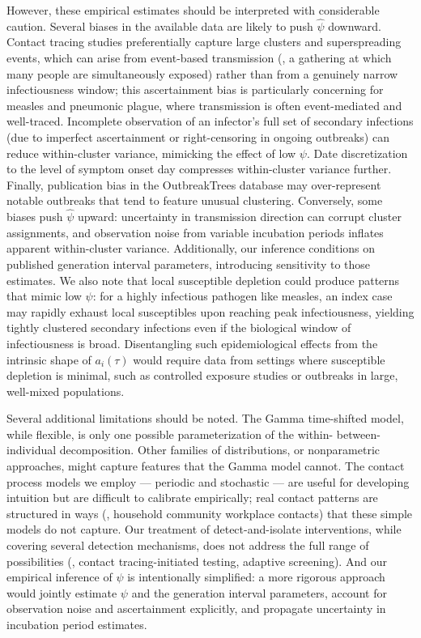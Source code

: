 However, these empirical estimates should be interpreted with considerable caution. Several biases in the available data are likely to push $\hat{\psi}$ downward. Contact tracing studies preferentially capture large clusters and superspreading events, which can arise from event-based transmission (\eg, a gathering at which many people are simultaneously exposed) rather than from a genuinely narrow infectiousness window; this ascertainment bias is particularly concerning for measles and pneumonic plague, where transmission is often event-mediated and well-traced. Incomplete observation of an infector's full set of secondary infections (due to imperfect ascertainment or right-censoring in ongoing outbreaks) can reduce within-cluster variance, mimicking the effect of low $\psi$. Date discretization to the level of symptom onset day compresses within-cluster variance further. Finally, publication bias in the OutbreakTrees database \citep{taube_outbreaktrees_2022} may over-represent notable outbreaks that tend to feature unusual clustering. Conversely, some biases push $\hat{\psi}$ upward: uncertainty in transmission direction can corrupt cluster assignments, and observation noise from variable incubation periods inflates apparent within-cluster variance. Additionally, our inference conditions on published generation interval parameters, introducing sensitivity to those estimates. We also note that local susceptible depletion could produce patterns that mimic low $\psi$: for a highly infectious pathogen like measles, an index case may rapidly exhaust local susceptibles upon reaching peak infectiousness, yielding tightly clustered secondary infections even if the biological window of infectiousness is broad. Disentangling such epidemiological effects from the intrinsic shape of $a_i(\tau)$ would require data from settings where susceptible depletion is minimal, such as controlled exposure studies or outbreaks in large, well-mixed populations.

Several additional limitations should be noted. The Gamma time-shifted model, while flexible, is only one possible parameterization of the within- \vs between-individual decomposition. Other families of distributions, or nonparametric approaches, might capture features that the Gamma model cannot. The contact process models we employ --- periodic and stochastic --- are useful for developing intuition but are difficult to calibrate empirically; real contact patterns are structured in ways (\eg, household \vs community \vs workplace contacts) that these simple models do not capture. Our treatment of detect-and-isolate interventions, while covering several detection mechanisms, does not address the full range of possibilities (\eg, contact tracing-initiated testing, adaptive screening). And our empirical inference of $\psi$ is intentionally simplified: a more rigorous approach would jointly estimate $\psi$ and the generation interval parameters, account for observation noise and ascertainment explicitly, and propagate uncertainty in incubation period estimates.

